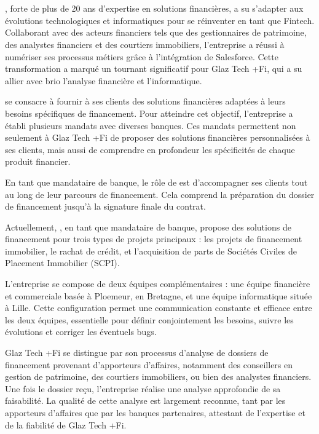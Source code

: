 \documentclass[12pt,oneside,noprintercorrection]{iut}
\begin{document}
\section{\glaz{}}

\glaz{}, forte de plus de 20 ans d'expertise en solutions financières, a su s'adapter aux évolutions technologiques et informatiques pour se réinventer en tant que Fintech. Collaborant avec des acteurs financiers tels que des gestionnaires de patrimoine, des analystes financiers et des courtiers immobiliers, l'entreprise a réussi à numériser ses processus métiers grâce à l'intégration de Salesforce. Cette transformation a marqué un tournant significatif pour Glaz Tech +Fi, qui a su allier avec brio l'analyse financière et l'informatique.

\gz{} se consacre à fournir à ses clients des solutions financières adaptées à leurs besoins spécifiques de financement. Pour atteindre cet objectif, l'entreprise a établi plusieurs mandats avec diverses banques. Ces mandats permettent non seulement à Glaz Tech +Fi de proposer des solutions financières personnalisées à ses clients, mais aussi de comprendre en profondeur les spécificités de chaque produit financier.

En tant que mandataire de banque, le rôle de \glaz{} est d'accompagner ses clients tout au long de leur parcours de financement. Cela comprend la préparation du dossier de financement jusqu'à la signature finale du contrat.

Actuellement, \gz{}, en tant que mandataire de banque, propose des solutions de financement pour trois types de projets principaux : les projets de financement immobilier, le rachat de crédit, et l'acquisition de parts de Sociétés Civiles de Placement Immobilier (SCPI).

L'entreprise se compose de deux équipes complémentaires : une équipe financière et commerciale basée à Ploemeur, en Bretagne, et une équipe informatique située à Lille. Cette configuration permet une communication constante et efficace entre les deux équipes, essentielle pour définir conjointement les besoins, suivre les évolutions et corriger les éventuels bugs.

Glaz Tech +Fi se distingue par son processus d'analyse de dossiers de financement provenant d'apporteurs d'affaires, notamment des conseillers en gestion de patrimoine, des courtiers immobiliers, ou bien des analystes financiers. Une fois le dossier reçu, l'entreprise réalise une analyse approfondie de sa faisabilité. La qualité de cette analyse est largement reconnue, tant par les apporteurs d'affaires que par les banques partenaires, attestant de l'expertise et de la fiabilité de Glaz Tech +Fi.
\end{document}
